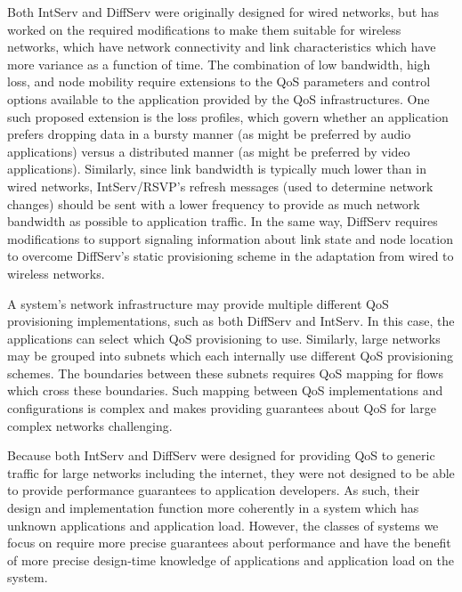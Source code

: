 Both IntServ and DiffServ were originally designed for wired networks, but \cite{diffServ_intServ_Mahadevan1999} has worked on the required modifications to make them suitable for wireless networks, which have network connectivity and link characteristics which have more variance as a function of time.  The combination of low bandwidth, high loss, and node mobility require extensions to the QoS parameters and control options available to the application provided by the QoS infrastructures.  One such proposed extension is the loss profiles, which govern whether an application prefers dropping data in a bursty manner (as might be preferred by audio applications) versus a distributed manner (as might be preferred by video applications).  Similarly, since link bandwidth is typically much lower than in wired networks, IntServ/RSVP's refresh messages (used to determine network changes) should be sent with a lower frequency to provide as much network bandwidth as possible to application traffic.  In the same way, DiffServ requires modifications to support signaling information about link state and node location to overcome DiffServ's static provisioning scheme in the adaptation from wired to wireless networks.  

A system's network infrastructure may provide multiple different QoS provisioning implementations, such as both DiffServ and IntServ.  In this case, the applications can select which QoS provisioning to use.  Similarly, large networks may be grouped into subnets which each internally use different QoS provisioning schemes.  The boundaries between these subnets requires QoS mapping for flows which cross these boundaries.  Such mapping between QoS implementations and configurations is complex and makes providing guarantees about QoS for large complex networks challenging.  

Because both IntServ and DiffServ were designed for providing QoS to generic traffic for large networks including the internet, they were not designed to be able to provide performance guarantees to application developers.  As such, their design and implementation function more coherently in a system which has unknown applications and application load.  However, the classes of systems we focus on require more precise guarantees about performance and have the benefit of more precise design-time knowledge of applications and application load on the system.  

